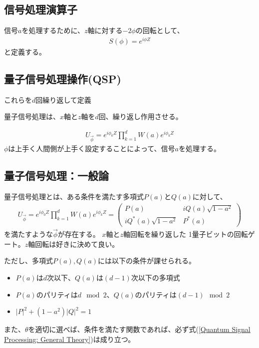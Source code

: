 \documentclass[platex,dvipdfmx]{jlreq}			%
\begin{document}
\subsection{信号処理演算子}
信号$a$を処理するために、$z$軸に対する$-2\phi$の回転として、
\begin{align}
    S(\phi) = e^{i \phi Z}
\end{align}
と定義する。

\subsection{量子信号処理操作(QSP)}
これらを$d$回繰り返して定義

量子信号処理は、$x$軸と$z$軸を$d$回、繰り返し作用させる。


\begin{align}
    U_{\vec{\phi}} = e^{i \phi_0 Z} \prod_{k = 1}^{d} W(a) e^{i \phi_k Z}
\end{align}
$\phi$は上手く人間側が上手く設定することによって、信号$a$を処理する。

\subsection{量子信号処理：一般論}
量子信号処理とは、ある条件を満たす多項式$P(a)$と$Q(a)$に対して、
\begin{align}
    U_{\vec{\phi}} = e^{i\phi_0 Z} \prod^d_{k = 1} W(a)e^{i\phi_kZ}
    = \begin{pmatrix}
    P(a) & iQ(a)\sqrt{1 - a^2} \\
    iQ^*(a)\sqrt{1 - a^2} & P^*(a)
    \end{pmatrix}
    \label{Quantum Signal Processing: General Theory}
\end{align}
を満たすような$\vec{\phi}$が存在する。
$x$軸と$z$軸回転を繰り返した 1量子ビットの回転ゲート。$z$軸回転は好きに決めて良い。

ただし、多項式$P(a), Q(a)$には以下の条件が課せられる。
\begin{itemize}
    \item $P(a)$は$d$次以下、$Q(a)$は$(d - 1)$次以下の多項式
    \item $P(a)$のパリティは$d \mod{2}$、$Q(a)$のパリティは$(d - 1) \mod{2}$
    \item $| P |^2+ (1 - a^2)|Q|^2 = 1$
\end{itemize}
また、$\theta$を適切に選べば、条件を満たす関数であれば、必ず式(\ref{Quantum Signal Processing: General Theory})は成り立つ。
\end{document}
